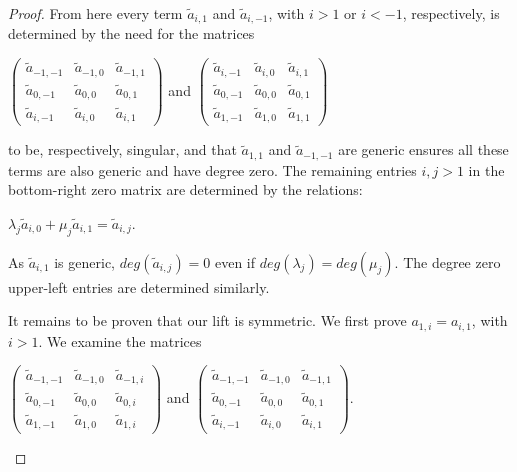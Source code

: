 \documentclass{article}
\begin{document}
\begin{proof}
  From here every term $\tilde{a}_{i,1}$ and $\tilde{a}_{i,-1}$, with $i > 1$ or $i < -1$, respectively, is determined by the need for the matrices
  \begin{center}
    $\left(\begin{array}{ccc} \tilde{a}_{-1,-1} & \tilde{a}_{-1,0} & \tilde{a}_{-1,1} \\ \tilde{a}_{0,-1} & \tilde{a}_{0,0} & \tilde{a}_{0,1} \\ \tilde{a}_{i,-1} & \tilde{a}_{i,0} & \tilde{a}_{i,1} \end{array}\right)$ \hspace{.1 in} and \hspace{.1 in} $\left(\begin{array}{ccc} \tilde{a}_{i,-1} & \tilde{a}_{i,0} & \tilde{a}_{i,1} \\ \tilde{a}_{0,-1} & \tilde{a}_{0,0} & \tilde{a}_{0,1} \\ \tilde{a}_{1,-1} & \tilde{a}_{1,0} & \tilde{a}_{1,1} \end{array}\right)$
  \end{center}
  to be, respectively, singular, and that $\tilde{a}_{1,1}$ and $\tilde{a}_{-1,-1}$ are generic ensures all these terms are also generic and have degree zero. The remaining entries $i,j > 1$ in the bottom-right zero matrix are determined by the relations:
  \begin{center}
    $\lambda_{j}\tilde{a}_{i,0} + \mu_{j}\tilde{a}_{i,1} = \tilde{a}_{i,j}$.
  \end{center}
  As $\tilde{a}_{i,1}$ is generic, $deg(\tilde{a}_{i,j}) = 0$ even if $deg(\lambda_{j}) = deg(\mu_{j})$. The degree zero upper-left entries are determined similarly.
  
  It remains to be proven that our lift is symmetric. We first prove $a_{1,i} = a_{i,1}$, with $i > 1$. We examine the matrices
  
  \begin{center}
    $\left(\begin{array}{ccc} \tilde{a}_{-1,-1} & \tilde{a}_{-1,0} & \tilde{a}_{-1,i} \\ \tilde{a}_{0,-1} & \tilde{a}_{0,0} & \tilde{a}_{0,i} \\ \tilde{a}_{1,-1} & \tilde{a}_{1,0} & \tilde{a}_{1,i} \end{array}\right)$ \hspace{.1 in} and \hspace{.1 in} $\left(\begin{array}{ccc} \tilde{a}_{-1,-1} & \tilde{a}_{-1,0} & \tilde{a}_{-1,1} \\ \tilde{a}_{0,-1} & \tilde{a}_{0,0} & \tilde{a}_{0,1} \\ \tilde{a}_{i,-1} & \tilde{a}_{i,0} & \tilde{a}_{i,1} \end{array}\right)$.
  \end{center}
  

\end{proof}
\end{document}
